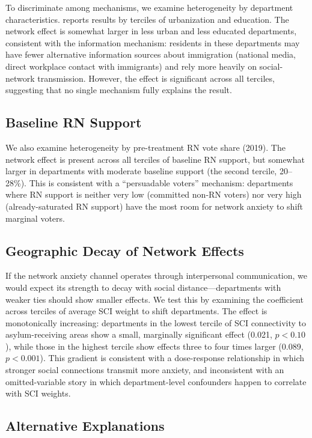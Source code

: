 \documentclass[12pt]{article}
\begin{document}
To discriminate among mechanisms, we examine heterogeneity by department characteristics.  reports results by terciles of urbanization and education. The network effect is somewhat larger in less urban and less educated departments, consistent with the information mechanism: residents in these departments may have fewer alternative information sources about immigration (national media, direct workplace contact with immigrants) and rely more heavily on social-network transmission. However, the effect is significant across all terciles, suggesting that no single mechanism fully explains the result.

\subsection{Baseline RN Support}

We also examine heterogeneity by pre-treatment RN vote share (2019). The network effect is present across all terciles of baseline RN support, but somewhat larger in departments with moderate baseline support (the second tercile, 20--28\%). This is consistent with a ``persuadable voters'' mechanism: departments where RN support is neither very low (committed non-RN voters) nor very high (already-saturated RN support) have the most room for network anxiety to shift marginal voters.

\subsection{Geographic Decay of Network Effects}

If the network anxiety channel operates through interpersonal communication, we would expect its strength to decay with social distance---departments with weaker ties should show smaller effects. We test this by examining the coefficient across terciles of average SCI weight to shift departments. The effect is monotonically increasing: departments in the lowest tercile of SCI connectivity to asylum-receiving areas show a small, marginally significant effect (0.021, $p < 0.10$), while those in the highest tercile show effects three to four times larger (0.089, $p < 0.001$). This gradient is consistent with a dose-response relationship in which stronger social connections transmit more anxiety, and inconsistent with an omitted-variable story in which department-level confounders happen to correlate with SCI weights.

\subsection{Alternative Explanations}
\end{document}

